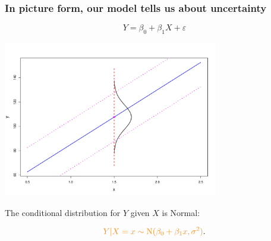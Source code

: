 \documentclass{beamer}
\newcommand{\rd}{\color{burntorange}}
\newcommand{\bk}{\color{black}}
\newcommand{\mr}[1]{\mathrm{#1}}
\newcommand{\bi}{\begin{itemize}}
\newcommand{\ib}{\end{itemize}}
\newcommand{\p}{\item}
\newcommand{\sk}{\vspace{.5cm}}
\begin{document}
\begin{frame}
\frametitle{In picture form, our model tells us about uncertainty} 

\vspace{-2mm}
$$
Y = \beta_0 + \beta_1 X + \varepsilon
$$

\vspace{-8mm}

\begin{center}
\includegraphics[width=3.7in]{figures/norm-cond-dist-2.pdf}
\end{center}

\vspace{2mm}

\vspace{-0.5cm}
The conditional distribution for $Y$ given $X$ is Normal:

\vspace{-3mm}
\[ \rd Y | X=x\sim \mr{N}(
\beta_0 + \beta_1 x, \sigma^2)\bk.
\]

\end{frame}


%
%
%
%
%






\end{document}
